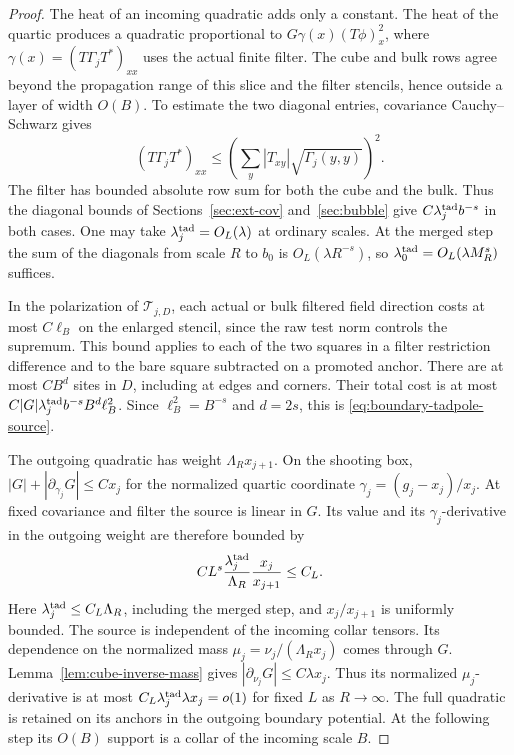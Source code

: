 \documentclass[11pt]{article}
\theoremstyle{definition}
\begin{document}
\begin{proof}
The heat of an incoming quadratic adds only a
constant. The heat of the quartic produces a
quadratic proportional to \(G\gamma(x)(T\phi)_x^2\), where
\(\gamma(x)=(T\Gamma_jT^*)_{xx}\) uses the actual finite filter.
The cube and bulk rows agree beyond the propagation range of this
slice and the filter stencils, hence outside a layer of width \(O(B)\).
To estimate the two diagonal entries, covariance Cauchy--Schwarz gives
\begin{equation}
 (T\Gamma_jT^*)_{xx}
 \le \left(\sum_y |T_{xy}|\sqrt{\Gamma_j(y,y)}\right)^2 .
\end{equation}
The filter has bounded absolute row sum for both the cube and the
bulk. Thus the diagonal bounds of Sections~\ref{sec:ext-cov}
and~\ref{sec:bubble} give \(C\lambda_j^{\rm tad} b^{-s}\) in both
cases. One may take \(\lambda_j^{\rm tad}=O_L(\lambda)\) at ordinary
scales. At the merged step the sum of the diagonals from scale \(R\)
to \(b_0\) is \(O_L(\lambda R^{-s})\), so
\(\lambda_0^{\rm tad}=O_L(\lambda M_R^s)\) suffices.

In the polarization of \(\mathcal T_{j,D}\), each actual or bulk
filtered field direction costs at most \(C\ell_B\) on the enlarged
stencil, since the raw test norm controls the supremum. This bound applies to each of
the two squares in a filter restriction difference and to the bare
square subtracted on a promoted anchor. There are at most \(CB^d\)
sites in \(D\), including at edges and corners. Their total cost is
at most \(C |G|\lambda_j^{\rm tad} b^{-s} B^d\ell_B^2\).
Since \(\ell_B^2=B^{-s}\) and \(d=2s\), this is
\eqref{eq:boundary-tadpole-source}.

The outgoing quadratic has weight \(\Lambda_R x_{j+1}\).
On the shooting box, \(|G|+|\partial_{\gamma_j}G|\le Cx_j\)
for the normalized quartic coordinate \(\gamma_j=(g_j-x_j)/x_j\).
At fixed covariance and filter the source is linear in \(G\).
Its value and its \(\gamma_j\)-derivative in the outgoing weight
are therefore bounded by
\begin{equation}
 C L^s\frac{\lambda_j^{\rm tad}}{\Lambda_R}
       \frac{x_j}{x_{j+1}}\le C_L .
\end{equation}
Here \(\lambda_j^{\rm tad}\le C_L\Lambda_R\), including the merged
step, and \(x_j/x_{j+1}\) is uniformly bounded. The source is independent
of the incoming collar tensors. Its dependence on the normalized mass
\(\mu_j=\nu_j/(\Lambda_R x_j)\) comes through \(G\).
Lemma~\ref{lem:cube-inverse-mass} gives
\(|\partial_{\nu_j}G|\le C\lambda x_j\). Thus its normalized
\(\mu_j\)-derivative is at most \(C_L\lambda_j^{\rm tad}\lambda x_j=o(1)\)
for fixed \(L\) as \(R\to\infty\). The full quadratic is retained on
its anchors in the outgoing boundary potential. At the following step
its \(O(B)\) support is a collar of the incoming scale \(B\).
\end{proof}
\end{document}
